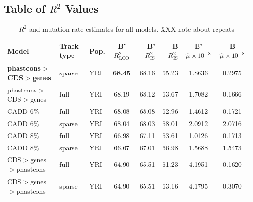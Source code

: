 \documentclass[11pt]{article}
\begin{document}
\subsection{Table of $R^2$ Values}

\begin{table}
\centering
\caption{$R^2$ and mutation rate estimates for all models. XXX note about repeats}
\begin{tabular}{lll|crr|cc}
    \textbf{Model} & \textbf{Track type} & \textbf{Pop.} & \textbf{B' $R_\text{LOO}^2$} & \textbf{B' $R_\text{IS}^2$} & \textbf{B $R_\text{IS}^2$} & \textbf{B' $\hat{\mu} \times 10^{-8}$} & \textbf{B $\hat{\mu} \times 10^{-8}$} \\[0.5ex] 
\hline
\hline
    \textbf{phastcons$>$CDS$>$genes} &            sparse &          YRI &                        \textbf{68.45} &             68.16 &            65.23 &                                 1.8636 &                                0.2975 \\
phastcons$>$CDS$>$genes &              full &          YRI &                        68.19 &             68.12 &            63.67 &                                 1.7082 &                                0.1666 \\
               CADD 6\% &              full &          YRI &                        68.08 &             68.08 &            62.96 &                                 1.4612 &                                0.1721 \\
               CADD 6\% &            sparse &          YRI &                        68.04 &             68.03 &            68.01 &                                 2.0912 &                                2.0716 \\
               CADD 8\% &              full &          YRI &                        66.98 &             67.11 &            63.61 &                                 1.0126 &                                0.1713 \\
               CADD 8\% &            sparse &          YRI &                        66.67 &             67.01 &            66.98 &                                 1.5688 &                                1.5473 \\
CDS$>$genes$>$phastcons &              full &          YRI &                        64.90 &             65.51 &            61.23 &                                 4.1951 &                                0.1620 \\
CDS$>$genes$>$phastcons &            sparse &          YRI &                        64.90 &             65.51 &            63.16 &                                 4.1795 &                                0.3070 \\

\end{tabular}
\end{table}
\end{document}
